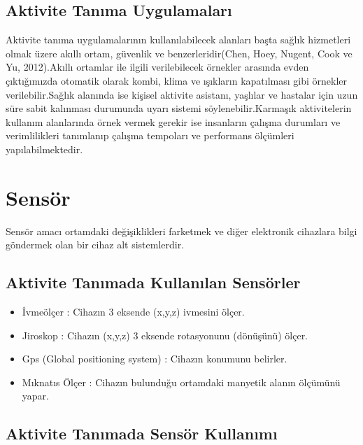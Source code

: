 \documentclass[12pt,twoside]{deuthesis}
\providecommand{\tightlist}{%
  \setlength{\itemsep}{0pt}\setlength{\parskip}{0pt}}
\begin{document}
\hypertarget{aktivite-tanux131ma-uygulamalarux131}{%
\subsection{Aktivite Tanıma Uygulamaları}\label{aktivite-tanux131ma-uygulamalarux131}}

Aktivite tanıma uygulamalarının kullanılabilecek alanları başta sağlık hizmetleri olmak üzere akıllı ortam, güvenlik ve benzerleridir(Chen, Hoey, Nugent, Cook ve Yu, 2012).Akıllı ortamlar ile ilgili verilebilecek örnekler arasında evden çıktığımızda otomatik olarak kombi, klima ve ışıkların kapatılması gibi örnekler verilebilir.Sağlık alanında ise kişisel aktivite asistanı, yaşlılar ve hastalar için uzun süre sabit kalınması durumunda uyarı sistemi söylenebilir.Karmaşık aktivitelerin kullanım alanlarında örnek vermek gerekir ise insanların çalışma durumları ve verimlilikleri tanımlanıp çalışma tempoları ve performans ölçümleri yapılabilmektedir.

\hypertarget{sensuxf6r}{%
\section{Sensör}\label{sensuxf6r}}

Sensör amacı ortamdaki değişiklikleri farketmek ve diğer elektronik cihazlara bilgi göndermek olan bir cihaz alt sistemlerdir.

\hypertarget{aktivite-tanux131mada-kullanux131lan-sensuxf6rler}{%
\subsection{Aktivite Tanımada Kullanılan Sensörler}\label{aktivite-tanux131mada-kullanux131lan-sensuxf6rler}}
\begin{itemize}
\tightlist
\item
  İvmeölçer : Cihazın 3 eksende (x,y,z) ivmesini ölçer.
\item
  Jiroskop : Cihazın (x,y,z) 3 eksende rotasyonunu (dönüşünü) ölçer.
\item
  Gps (Global positioning system) : Cihazın konumunu belirler.
\item
  Mıknatıs Ölçer : Cihazın bulunduğu ortamdaki manyetik alanın ölçümünü yapar.
\end{itemize}
\hypertarget{aktivite-tanux131mada-sensuxf6r-kullanux131mux131}{%
\subsection{Aktivite Tanımada Sensör Kullanımı}\label{aktivite-tanux131mada-sensuxf6r-kullanux131mux131}}
\end{document}
